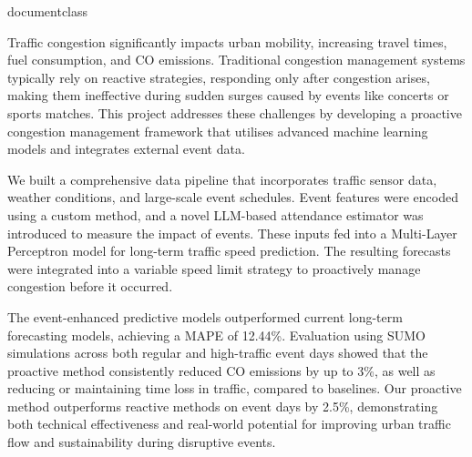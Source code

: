 \csname documentclass
\graphicspath{{\subfix{../images/}}}


Traffic congestion significantly impacts urban mobility, increasing travel times, fuel consumption, and CO emissions. Traditional congestion management systems typically rely on reactive strategies, responding only after congestion arises, making them ineffective during sudden surges caused by events like concerts or sports matches. This project addresses these challenges by developing a proactive congestion management framework that utilises advanced machine learning models and integrates external event data.

We built a comprehensive data pipeline that incorporates traffic sensor data, weather conditions, and large-scale event schedules. Event features were encoded using a custom method, and a novel LLM-based attendance estimator was introduced to measure the impact of events. These inputs fed into a Multi-Layer Perceptron model for long-term traffic speed prediction. The resulting forecasts were integrated into a variable speed limit strategy to proactively manage congestion before it occurred.

The event-enhanced predictive models outperformed current long-term forecasting models, achieving a MAPE of 12.44\%. Evaluation using SUMO simulations across both regular and high-traffic event days showed that the proactive method consistently reduced CO emissions by up to 3\%, as well as reducing or maintaining time loss in traffic, compared to baselines. Our proactive method outperforms reactive methods on event days by 2.5\%, demonstrating both technical effectiveness and real-world potential for improving urban traffic flow and sustainability during disruptive events.


